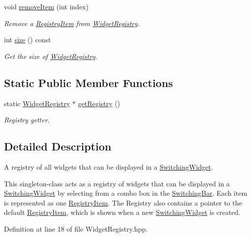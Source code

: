 \begin{DoxyCompactItemize}
void \hyperlink{class_widget_registry_a96abefe3fed38e9424609cc3cf2f8d7d}{remove\+Item} (int index)
\begin{DoxyCompactList}\small\item\em Remove a \hyperlink{class_registry_item}{Registry\+Item} from \hyperlink{class_widget_registry}{Widget\+Registry}. \end{DoxyCompactList}\item 
int \hyperlink{class_widget_registry_a13ca89bca85a4680f79e56d29263d219}{size} () const
\begin{DoxyCompactList}\small\item\em Get the size of \hyperlink{class_widget_registry}{Widget\+Registry}. \end{DoxyCompactList}\end{DoxyCompactItemize}
\subsection*{Static Public Member Functions}
\begin{DoxyCompactItemize}
\item 
static \hyperlink{class_widget_registry}{Widget\+Registry} $\ast$ \hyperlink{class_widget_registry_ad0c8eaf65a4c00947866a56cc2c48eb2}{get\+Registry} ()
\begin{DoxyCompactList}\small\item\em Registry getter. \end{DoxyCompactList}\end{DoxyCompactItemize}


\subsection{Detailed Description}
A registry of all widgets that can be displayed in a \hyperlink{class_switching_widget}{Switching\+Widget}. 

This singleton-\/class acts as a registry of widgets that can be displayed in a \hyperlink{class_switching_widget}{Switching\+Widget} by selecting from a combo box in the \hyperlink{class_switching_bar}{Switching\+Bar}. Each item is represented as one \hyperlink{class_registry_item}{Registry\+Item}. The Registry also contains a pointer to the default \hyperlink{class_registry_item}{Registry\+Item}, which is shown when a new \hyperlink{class_switching_widget}{Switching\+Widget} is created. 

Definition at line 18 of file Widget\+Registry.\+hpp.



